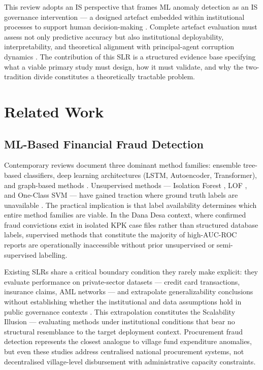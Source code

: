 \documentclass[3p,times,procedia]{elsarticle}
\begin{document}
This review adopts an IS perspective that frames ML anomaly detection as an IS governance intervention --- a designed artefact embedded within institutional processes to support human decision-making \cite{method_hevner2004}. Complete artefact evaluation must assess not only predictive accuracy but also institutional deployability, interpretability, and theoretical alignment with principal-agent corruption dynamics \cite{method_jensen1976}. The contribution of this SLR is a structured evidence base specifying what a viable primary study must design, how it must validate, and why the two-tradition divide constitutes a theoretically tractable problem.

\section{Related Work}
\label{sec:related}

\subsection{ML-Based Financial Fraud Detection}

Contemporary reviews document three dominant method families: ensemble tree-based classifiers, deep learning architectures (LSTM, Autoencoder, Transformer), and graph-based methods \cite{p001,p003,p004,p022,p037}. Unsupervised methods --- Isolation Forest \cite{p015}, LOF \cite{p041}, and One-Class SVM --- have gained traction where ground truth labels are unavailable \cite{p003,p015,p041}. The practical implication is that label availability determines which entire method families are viable. In the Dana Desa context, where confirmed fraud convictions exist in isolated KPK case files rather than structured database labels, supervised methods that constitute the majority of high-AUC-ROC reports \cite{p003,p007,p022,p026,p039} are operationally inaccessible without prior unsupervised or semi-supervised labelling.

Existing SLRs share a critical boundary condition they rarely make explicit: they evaluate performance on private-sector datasets --- credit card transactions, insurance claims, AML networks --- and extrapolate generalizability conclusions without establishing whether the institutional and data assumptions hold in public governance contexts \cite{p001,p022,p037}. This extrapolation constitutes the Scalability Illusion --- evaluating methods under institutional conditions that bear no structural resemblance to the target deployment context. Procurement fraud detection \cite{p008,p043} represents the closest analogue to village fund expenditure anomalies, but even these studies address centralised national procurement systems, not decentralised village-level disbursement with administrative capacity constraints.
\end{document}

